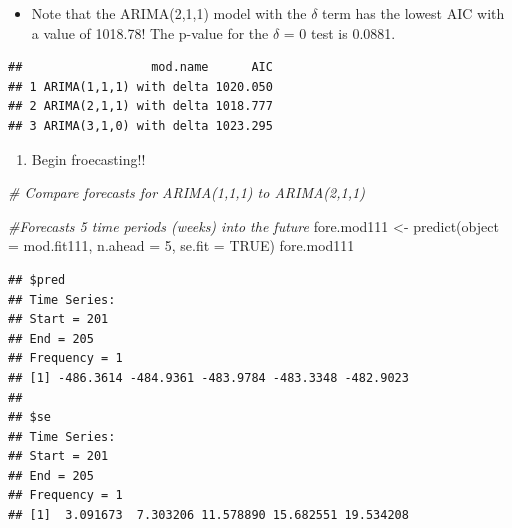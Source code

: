 \documentclass[
]{book}
\newenvironment{Shaded}{\begin{snugshade}}{\end{snugshade}}
\newcommand{\AttributeTok}[1]{\textcolor[rgb]{0.77,0.63,0.00}{#1}}
\newcommand{\CommentTok}[1]{\textcolor[rgb]{0.56,0.35,0.01}{\textit{#1}}}
\newcommand{\ConstantTok}[1]{\textcolor[rgb]{0.00,0.00,0.00}{#1}}
\newcommand{\DecValTok}[1]{\textcolor[rgb]{0.00,0.00,0.81}{#1}}
\newcommand{\FunctionTok}[1]{\textcolor[rgb]{0.00,0.00,0.00}{#1}}
\newcommand{\NormalTok}[1]{#1}
\newcommand{\OtherTok}[1]{\textcolor[rgb]{0.56,0.35,0.01}{#1}}
\newcommand{\SpecialCharTok}[1]{\textcolor[rgb]{0.00,0.00,0.00}{#1}}
\newcommand{\StringTok}[1]{\textcolor[rgb]{0.31,0.60,0.02}{#1}}
\providecommand{\tightlist}{%
  \setlength{\itemsep}{0pt}\setlength{\parskip}{0pt}}
\theoremstyle{definition}
\theoremstyle{definition}
\theoremstyle{definition}
\theoremstyle{definition}
\theoremstyle{remark}
\begin{document}
\begin{itemize}
\tightlist
\item
  Note that the ARIMA(2,1,1) model with the \(\delta\) term has the lowest AIC with a value of 1018.78! The p-value for the \(\delta\) = 0 test is 0.0881.
\end{itemize}

\begin{Shaded}
\end{Shaded}

\begin{verbatim}
##                  mod.name      AIC
## 1 ARIMA(1,1,1) with delta 1020.050
## 2 ARIMA(2,1,1) with delta 1018.777
## 3 ARIMA(3,1,0) with delta 1023.295
\end{verbatim}

\begin{enumerate}
\def\labelenumi{\arabic{enumi}.}
\setcounter{enumi}{5}
\tightlist
\item
  Begin froecasting!!
\end{enumerate}

\begin{Shaded}
\begin{Highlighting}[]
\CommentTok{\# Compare forecasts for ARIMA(1,1,1) to ARIMA(2,1,1)}

  \CommentTok{\#Forecasts 5 time periods (weeks) into the future}
\NormalTok{  fore.mod111 }\OtherTok{\textless{}{-}} \FunctionTok{predict}\NormalTok{(}\AttributeTok{object =}\NormalTok{ mod.fit111, }\AttributeTok{n.ahead =} \DecValTok{5}\NormalTok{, }\AttributeTok{se.fit =} \ConstantTok{TRUE}\NormalTok{)}
\NormalTok{  fore.mod111}
\end{Highlighting}
\end{Shaded}

\begin{verbatim}
## $pred
## Time Series:
## Start = 201 
## End = 205 
## Frequency = 1 
## [1] -486.3614 -484.9361 -483.9784 -483.3348 -482.9023
## 
## $se
## Time Series:
## Start = 201 
## End = 205 
## Frequency = 1 
## [1]  3.091673  7.303206 11.578890 15.682551 19.534208
\end{verbatim}
\end{document}
